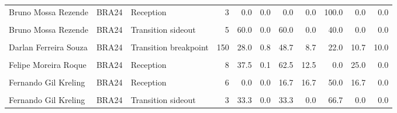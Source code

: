 \documentclass[
]{book}
\begin{document}
\begin{table}[!h]
{\begin{tabular}[t]{lllrrrrrrrr}
Bruno Mossa Rezende & BRA24 & Reception & 3 & 0.0 & 0.0 & 0.0 & 0.0 & 100.0 & 0.0 & 0.0\\
\addlinespace
\cellcolor{gray!10}{Bruno Mossa Rezende} & \cellcolor{gray!10}{BRA24} & \cellcolor{gray!10}{Transition breakpoint} & \cellcolor{gray!10}{4} & \cellcolor{gray!10}{0.0} & \cellcolor{gray!10}{0.0} & \cellcolor{gray!10}{25.0} & \cellcolor{gray!10}{25.0} & \cellcolor{gray!10}{25.0} & \cellcolor{gray!10}{25.0} & \cellcolor{gray!10}{0.0}\\
Bruno Mossa Rezende & BRA24 & Transition sideout & 5 & 60.0 & 0.0 & 60.0 & 0.0 & 40.0 & 0.0 & 0.0\\
\cellcolor{gray!10}{Darlan Ferreira Souza} & \cellcolor{gray!10}{BRA24} & \cellcolor{gray!10}{Reception} & \cellcolor{gray!10}{284} & \cellcolor{gray!10}{44.0} & \cellcolor{gray!10}{1.7} & \cellcolor{gray!10}{58.5} & \cellcolor{gray!10}{9.2} & \cellcolor{gray!10}{18.0} & \cellcolor{gray!10}{5.3} & \cellcolor{gray!10}{9.2}\\
Darlan Ferreira Souza & BRA24 & Transition breakpoint & 150 & 28.0 & 0.8 & 48.7 & 8.7 & 22.0 & 10.7 & 10.0\\
\cellcolor{gray!10}{Darlan Ferreira Souza} & \cellcolor{gray!10}{BRA24} & \cellcolor{gray!10}{Transition sideout} & \cellcolor{gray!10}{72} & \cellcolor{gray!10}{23.6} & \cellcolor{gray!10}{0.3} & \cellcolor{gray!10}{43.1} & \cellcolor{gray!10}{12.5} & \cellcolor{gray!10}{25.0} & \cellcolor{gray!10}{5.6} & \cellcolor{gray!10}{13.9}\\
\addlinespace
Felipe Moreira Roque & BRA24 & Reception & 8 & 37.5 & 0.1 & 62.5 & 12.5 & 0.0 & 25.0 & 0.0\\
\cellcolor{gray!10}{Felipe Moreira Roque} & \cellcolor{gray!10}{BRA24} & \cellcolor{gray!10}{Transition breakpoint} & \cellcolor{gray!10}{4} & \cellcolor{gray!10}{0.0} & \cellcolor{gray!10}{0.0} & \cellcolor{gray!10}{25.0} & \cellcolor{gray!10}{0.0} & \cellcolor{gray!10}{50.0} & \cellcolor{gray!10}{25.0} & \cellcolor{gray!10}{0.0}\\
Fernando Gil Kreling & BRA24 & Reception & 6 & 0.0 & 0.0 & 16.7 & 16.7 & 50.0 & 16.7 & 0.0\\
\cellcolor{gray!10}{Fernando Gil Kreling} & \cellcolor{gray!10}{BRA24} & \cellcolor{gray!10}{Transition breakpoint} & \cellcolor{gray!10}{3} & \cellcolor{gray!10}{66.7} & \cellcolor{gray!10}{0.0} & \cellcolor{gray!10}{66.7} & \cellcolor{gray!10}{0.0} & \cellcolor{gray!10}{33.3} & \cellcolor{gray!10}{0.0} & \cellcolor{gray!10}{0.0}\\
Fernando Gil Kreling & BRA24 & Transition sideout & 3 & 33.3 & 0.0 & 33.3 & 0.0 & 66.7 & 0.0 & 0.0\\

\end{tabular}}
\end{table}
\end{document}
